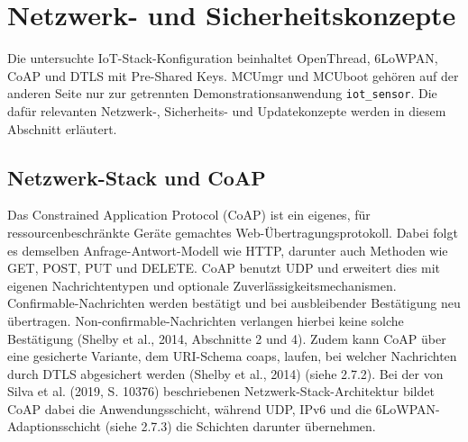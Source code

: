 \section{Netzwerk- und Sicherheitskonzepte}
Die untersuchte IoT-Stack-Konfiguration beinhaltet OpenThread, 6LoWPAN, CoAP und DTLS mit Pre-Shared Keys. MCUmgr und MCUboot geh{\"o}ren auf der anderen Seite nur zur getrennten Demonstrationsanwendung \lstinline[style=fileinline]|iot_sensor|. Die daf{\"u}r relevanten Netzwerk-, Sicherheits- und Updatekonzepte werden in diesem Abschnitt erl{\"a}utert.

\subsection{Netzwerk-Stack und CoAP}
Das Constrained Application Protocol (CoAP) ist ein eigenes, f{\"u}r ressourcenbeschr{\"a}nkte Ger{\"a}te gemachtes Web-{\"U}bertragungsprotokoll. Dabei folgt es demselben Anfrage-Antwort-Modell wie HTTP, darunter auch Methoden wie GET, POST, PUT und DELETE. CoAP benutzt UDP und erweitert dies mit eigenen Nachrichtentypen und optionale Zuverl{\"a}ssigkeitsmechanismen. Confirmable-Nachrichten werden best{\"a}tigt und bei ausbleibender Best{\"a}tigung neu {\"u}bertragen. Non-confirmable-Nachrichten verlangen hierbei keine solche Best{\"a}tigung (Shelby et al., 2014, Abschnitte 2 und 4). Zudem kann CoAP {\"u}ber eine gesicherte Variante, dem URI-Schema \glqq{}coaps\grqq{}, laufen, bei welcher Nachrichten durch DTLS abgesichert werden (Shelby et al., 2014) (siehe 2.7.2). Bei der von Silva et al. (2019, S. 10376) beschriebenen Netzwerk-Stack-Architektur bildet CoAP dabei die Anwendungsschicht, w{\"a}hrend UDP, IPv6 und die 6LoWPAN-Adaptionsschicht (siehe 2.7.3) die Schichten darunter {\"u}bernehmen.

